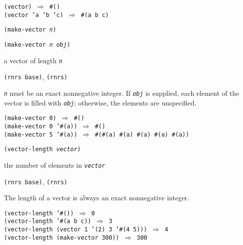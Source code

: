 \begin{alltt}
(vector) \(\Rightarrow\) \#{}()
(vector 'a 'b 'c) \(\Rightarrow\) \#{}(a b c)
\end{alltt}

\begin{description}

\label{objects_s232}\item[procedure] \texttt{(make-vector \textit{n})}



\item[procedure] \texttt{(make-vector \textit{n} \textit{obj})}



\item[returns] a vector of length \texttt{\textit{n}}


\item[libraries] \texttt{(rnrs base)}, \texttt{(rnrs)}
\end{description}

\texttt{\textit{n}} must be an exact nonnegative integer.
If \texttt{\textit{obj}} is supplied, each element of the vector is filled with
\texttt{\textit{obj}}; otherwise, the elements are unspecified.

\begin{alltt}
(make-vector 0) \(\Rightarrow\) \#{}()
(make-vector 0 '\#{}(a)) \(\Rightarrow\) \#{}()
(make-vector 5 '\#{}(a)) \(\Rightarrow\) \#{}(\#{}(a) \#{}(a) \#{}(a) \#{}(a) \#{}(a))
\end{alltt}

\begin{description}

\label{objects_s233}\item[procedure] \texttt{(vector-length \textit{vector})}



\item[returns] the number of elements in \texttt{\textit{vector}}


\item[libraries] \texttt{(rnrs base)}, \texttt{(rnrs)}
\end{description}


The length of a vector is always an exact nonnegative integer.


\begin{alltt}
(vector-length '\#{}()) \(\Rightarrow\) 0
(vector-length '\#{}(a b c)) \(\Rightarrow\) 3
(vector-length (vector 1 '(2) 3 '\#{}(4 5))) \(\Rightarrow\) 4
(vector-length (make-vector 300)) \(\Rightarrow\) 300
\end{alltt}

